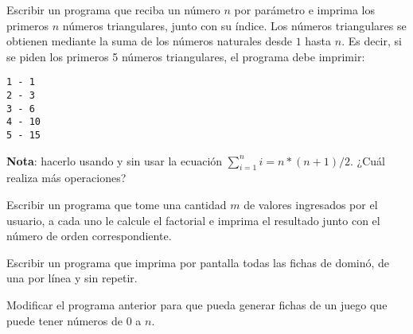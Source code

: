\begin{ejercicio}
Escribir un programa que reciba un número $n$ por
parámetro e imprima los primeros $n$ números triangulares, junto con su
índice. Los números triangulares se obtienen mediante la suma de los números
naturales desde $1$ hasta $n$.  Es decir, si se piden los primeros 5
números triangulares, el programa debe imprimir:

\begin{verbatim}
1 - 1
2 - 3
3 - 6
4 - 10
5 - 15
\end{verbatim}

{\bf Nota}: hacerlo usando y sin usar la ecuación $\sum_{i=1}^n i = n*(n+1)/2$.
¿Cuál realiza más operaciones?
\end{ejercicio}

\begin{ejercicio}
Escribir un programa que tome una cantidad $m$ de valores ingresados
por el usuario, a cada uno le calcule el factorial e imprima el resultado
junto con el número de orden correspondiente.
\end{ejercicio}

\begin{ejercicio}
Escribir un programa que imprima por pantalla todas las fichas de dominó, de
una por línea y sin repetir.
\end{ejercicio}

\begin{ejercicio}
Modificar el programa anterior para que pueda generar fichas de un juego
que puede tener números de 0 a $n$.
\end{ejercicio}
